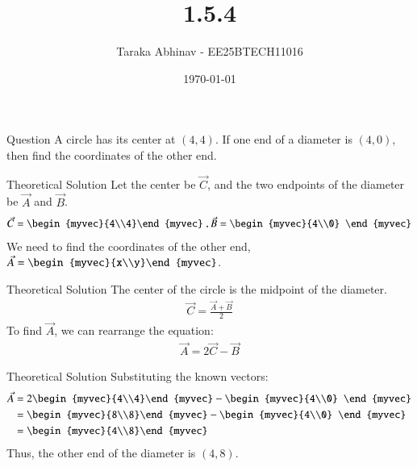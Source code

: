 \documentclass{beamer}
\title{1.5.4}
\author{Taraka Abhinav - EE25BTECH11016}
\date{\today}
\begin{document}
\frame{\titlepage}

\begin{frame}{Question}
A circle has its center at $(4, 4)$. If one end of a diameter is $(4, 0)$, then find the coordinates of the other end.
\end{frame}

\begin{frame}{Theoretical Solution}
Let the center be $\vec{C}$, and the two endpoints of the diameter be $\vec{A}$ and $\vec{B}$.
\begin{align*}
    \vec{C}=\begin{myvec}{4\\4}\end{myvec} \;, \vec{B}=\begin{myvec}{4\\0} \end{myvec}
\end{align*}
We need to find the coordinates of the other end, $\vec{A} = \begin{myvec}{x\\y}\end{myvec}$.
\end{frame}

\begin{frame}{Theoretical Solution}
The center of the circle is the midpoint of the diameter.
\begin{align*}
    \vec{C} = \frac{\vec{A}+\vec{B}}{2}
\end{align*}
To find $\vec{A}$, we can rearrange the equation:
\begin{align*}
    \vec{A} = 2\vec{C} - \vec{B}
\end{align*}
\end{frame}

\begin{frame}{Theoretical Solution}
Substituting the known vectors:
\begin{align*}
\vec{A} &= 2\begin{myvec}{4\\4}\end{myvec} - \begin{myvec}{4\\0} \end{myvec} \\
       &= \begin{myvec}{8\\8}\end{myvec} - \begin{myvec}{4\\0} \end{myvec} \\
       &= \begin{myvec}{4\\8}\end{myvec}
\end{align*}
Thus, the other end of the diameter is $(4, 8)$.
\end{frame}
\end{document}
